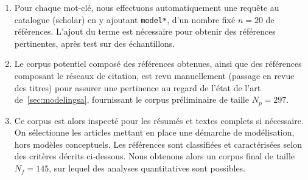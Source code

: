 {\begin{enumerate}
\item Pour chaque mot-clé, nous effectuons automatiquement une requête au catalogue (scholar) en y ajoutant \texttt{model*}, d'un nombre fixé $n=20$ de références. L'ajout du terme est nécessaire pour obtenir des références pertinentes, après test sur des échantillons.
\item Le corpus potentiel composé des références obtenues, ainsi que des références composant le réseaux de citation, est revu manuellement (passage en revue des titres) pour assurer une pertinence au regard de l'état de l'art de~\ref{sec:modelingsa}, fournissant le corpus préliminaire de taille $N_p = 297$.
\item Ce corpus est alors inspecté pour les résumés et textes complets si nécessaire. On sélectionne les articles mettant en place une démarche de modélisation, hors modèles conceptuels. Les références sont classifiées et caractérisées selon des critères décrits ci-dessous. Nous obtenons alors un corpus final de taille $N_f = 145$, sur lequel des analyses quantitatives sont possibles.
\end{enumerate}
}



